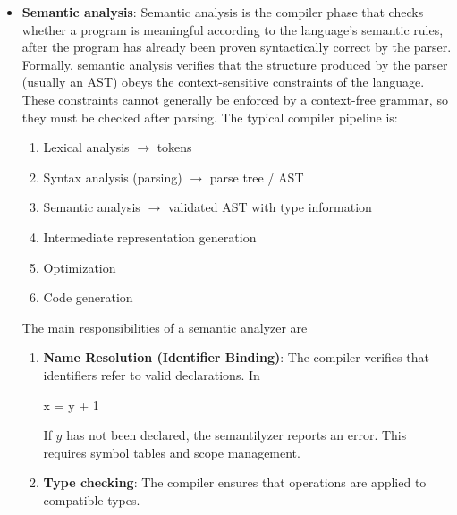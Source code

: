 \documentclass{report}
\begin{document}
\begin{itemize}
\begin{itemize}
                \item serve as the body of constructs such as if, while, and for.
            \end{itemize}
            In an \textbf{Abstract Syntax Tree}, a statement block is typically represented by a block node whose children are the statements contained in the block.
        \item \textbf{Semantic analysis}: Semantic analysis is the compiler phase that checks whether a program is meaningful according to the language’s semantic rules, after the program has already been proven syntactically correct by the parser.
            \bigbreak \noindent 
            Formally, semantic analysis verifies that the structure produced by the parser (usually an AST) obeys the context-sensitive constraints of the language.
            \bigbreak \noindent 
            These constraints cannot generally be enforced by a context-free grammar, so they must be checked after parsing. The typical compiler pipeline is:
            \begin{enumerate}
                \item Lexical analysis $\to$ tokens
                \item Syntax analysis (parsing) $\to$ parse tree / AST
                \item Semantic analysis $\to $ validated AST with type information
                \item Intermediate representation generation
                \item Optimization
                \item Code generation
            \end{enumerate}
            The main responsibilities of a semantic analyzer are
            \begin{enumerate}
                \item \textbf{Name Resolution (Identifier Binding)}: The compiler verifies that identifiers refer to valid declarations. In 
                    \bigbreak \noindent 
                    \begin{cppcode}
                    x = y + 1
                    \end{cppcode}
                    \bigbreak \noindent 
                    If $y$ has not been declared, the semantilyzer reports an error. This requires symbol tables and scope management.
                \item \textbf{Type checking}: The compiler ensures that operations are applied to compatible types.

\end{enumerate}
\end{itemize}
\end{document}
